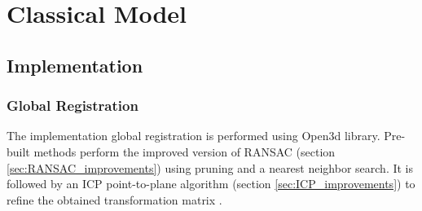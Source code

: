 \section{Classical Model}
\subsection{Implementation}
\subsubsection{Global Registration}
The implementation global registration is performed using Open3d library. Pre-built methods perform the improved version of RANSAC (section \ref{sec:RANSAC_improvements})  using pruning and a nearest neighbor search. It is followed by an ICP point-to-plane algorithm (section \ref{sec:ICP_improvements}) to refine the obtained transformation matrix \cite{Open3D}.\\

